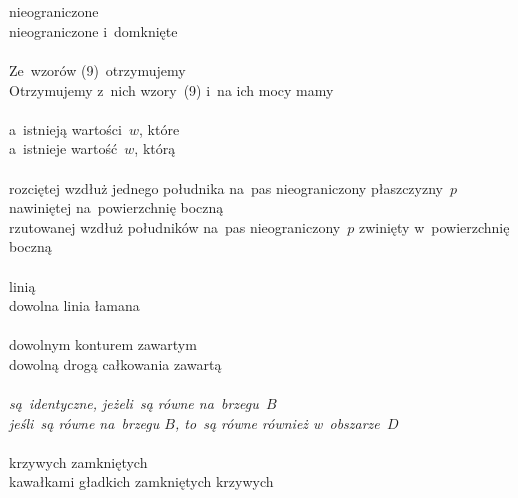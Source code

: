 \documentclass[a4paper,11pt]{article}
\begin{document}
\noi \\
 \\
\Jest nieograniczone \\
\Pow  nieograniczone i~domknięte \\
 \\
\Jest Ze~wzorów (9)~otrzymujemy \\
\Pow  Otrzymujemy z~nich wzory~(9) i~na ich mocy mamy \\
 \\
\Jest a~istnieją wartości~$w$, które \\
\Pow  a~istnieje wartość~$w$, którą \\
 \\
\Jest rozciętej wzdłuż jednego południka na~pas nieograniczony
płaszczyzny~$p$ nawiniętej na~powierzchnię boczną \\
\Pow rzutowanej wzdłuż południków na~pas nieograniczony~$p$ zwinięty
w~powierzchnię boczną \\
 \\
\Jest linią \\
\Pow dowolna linia łamana \\
 \\
\Jest dowolnym konturem zawartym \\
\Pow  dowolną drogą całkowania zawartą \\
 \\
\Jest \emph{są~identyczne, jeżeli~są równe na~brzegu~$B$} \\
\Pow \emph{jeśli~są równe na~brzegu $B$, to~są równe również
  w~obszarze~$D$} \\
 \\
\Jest krzywych zamkniętych \\
\Pow  kawałkami gładkich zamkniętych krzywych \\

\vspace{\spaceTwo}







\end{document}
